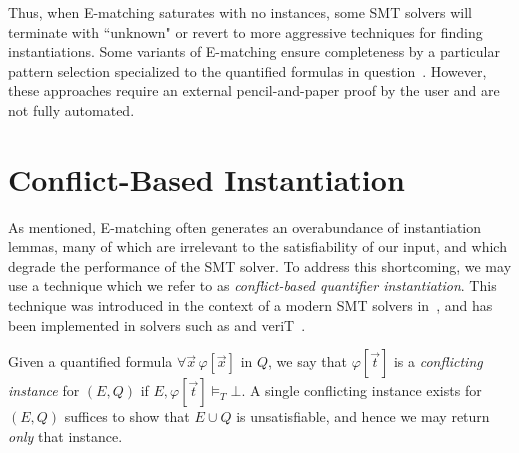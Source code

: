 \documentclass[oribibl]{llncs}
\begin{document}
Thus, when E-matching saturates with no instances, some SMT solvers will terminate with ``unknown"
or revert to more aggressive techniques for finding instantiations.
Some variants of E-matching ensure completeness by a particular pattern selection specialized to the quantified formulas in question~\cite{dross2016adding,bansaldeciding}.
However, these approaches require an external pencil-and-paper proof by the user and are not fully automated.

\section{Conflict-Based Instantiation}
\label{sec:cbqi}

As mentioned, E-matching often generates an overabundance of instantiation lemmas, 
many of which are irrelevant to the satisfiability of our input,
and which degrade the performance of the SMT solver.
To address this shortcoming, we may use a technique which we refer to as \emph{conflict-based quantifier instantiation}.
This technique was introduced in the context of a modern SMT solvers in~\cite{ReynoldsTinelliMoura14}, 
and has been implemented in solvers such as \cvc and veriT~\cite{DBLP:conf/cade/Barbosa16}.

Given a quantified formula $\forall \vec x\, \varphi[ \vec x ]$ in $Q$,
we say that $\varphi[ \vec t ]$ is a \emph{conflicting instance} for $( E, Q )$ if $E, \varphi[ \vec t ] \models_T \bot$.
A single conflicting instance exists for $(E, Q )$ suffices to show that $E \cup Q$ is unsatisfiable,
and hence we may return \emph{only} that instance.
\end{document}
